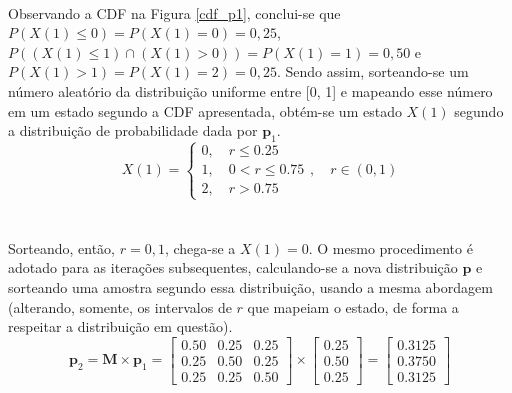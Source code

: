 \documentclass{report}
\begin{document}
\paragraph{} Observando a CDF na Figura \ref{cdf_p1}, conclui-se que $P(X(1) \leq 0) = P(X(1) = 0) = 0,25$, $P((X(1) \leq 1) \cap (X(1) > 0)) = P(X(1) = 1) = 0,50$ e $P(X(1) > 1) = P(X(1) = 2) = 0,25$. Sendo assim, sorteando-se um número aleatório da distribuição uniforme entre [0, 1] e mapeando esse número em um estado segundo a CDF apresentada, obtém-se um estado $X(1)$ segundo a distribuição de probabilidade dada por $\mathbf{p}_1$.\\

\begin{equation*}
X(1) =  \begin{cases}
			0, \quad	r \leq 0.25\\
			1, \quad	0 < r \leq 0.75\\
			2, \quad	r > 0.75
		\end{cases} , \quad r \in (0,1)
\end{equation*}\\

\paragraph{} Sorteando, então, $r = 0,1$, chega-se a $X(1) = 0$. O mesmo procedimento é adotado para as iterações subsequentes, calculando-se a nova distribuição $\mathbf{p}$ e sorteando uma amostra segundo essa distribuição, usando a mesma abordagem (alterando, somente, os intervalos de $r$ que mapeiam o estado, de forma a respeitar a distribuição em questão).\\

\begin{equation*}
\mathbf{p}_2 = \mathbf{M} \times \mathbf{p}_1 = \left[ \begin{array}{ccc}
0.50 & 0.25 & 0.25 \\ 
0.25 & 0.50 & 0.25 \\ 
0.25 & 0.25 & 0.50 
\end{array} \right] \times \left[\begin{array}{c}
0.25 \\ 
0.50 \\ 
0.25
\end{array} \right] = \left[ \begin{array}{c}
0.3125 \\ 
0.3750 \\ 
0.3125
\end{array}  \right]
\end{equation*}\\
\end{document}
